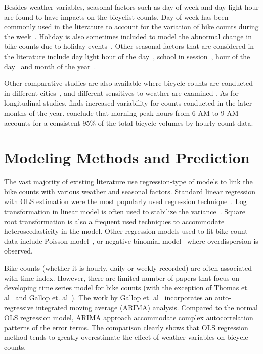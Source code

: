 \documentclass [11pt, proquest] {uwthesis}[2015/03/03]
\begin{document}
Besides weather variables, seasonal factors such as day of week and day light hour are found to have impacts on the bicyclist counts. Day of week has been commonly used in the literature to account for the variation of bike counts during the week~\cite{Ahmed12,PeterWeiran16,Miranda-Moreno:2011aa}. Holiday is also sometimes included to model the abnormal change in bike counts due to holiday events~\cite{Rose07}. Other seasonal factors that are considered in the literature include day light hour of the day~\cite{Ahmed12}, school in session~\cite{PeterWeiran16}, hour of the day~\cite{Miranda-Moreno:2011aa} and month of the year~\cite{Tin:2012aa}.

Other comparative studies are also available where bicycle counts are conducted in different cities~\cite{Nosal:2014aa}, and different sensitives to weather are examined \cite{Rose:2011aa}. As for longitudinal studies, \cite{Niemeier:1996aa} finds increased variability for counts conducted in the later months of the year. \cite{Jones:2010aa} conclude that morning peak hours from 6 AM to 9 AM accounts for a consistent 95\% of the total bicycle volumes by hourly count data. 

\section{Modeling Methods and Prediction}

The vast majority of existing literature use regression-type of models to link the bike counts with various weather and seasonal factors. Standard linear regression with OLS estimation were the most popularly used regression technique~\cite{Jones:2008aa,Jones:2010aa}. Log transformation in linear model is often used to stabilize the variance~\cite{Nosal:2014aa,Thomas:2009aa,Ahmed12}. Square root transformation is also a frequent used techniques to accommodate heteroscedasticity in the model. Other regression models used to fit bike count data include Poisson model~\cite{Niemeier:1996aa,Miranda-Moreno:2011aa}, or negative binomial model~\cite{PeterWeiran16} where overdispersion is observed.  

Bike counts (whether it is hourly, daily or weekly recorded) are often associated with time index. However, there are limited number of papers that focus on developing time series model for bike counts (with the exception of Thomas et. al~\cite{Thomas:2009aa} and Gallop et. al~\cite{Gallop:2012aa}). The work by Gallop et. al~\cite{Gallop:2012aa} incorporates an auto-regressive integrated moving average (ARIMA) analysis. Compared to the normal OLS regression model, ARIMA approach accommodate  complex autocorrelation patterns of the error terms. The comparison clearly shows that OLS regression method tends to greatly overestimate the effect of weather variables on bicycle counts. 
\end{document}
